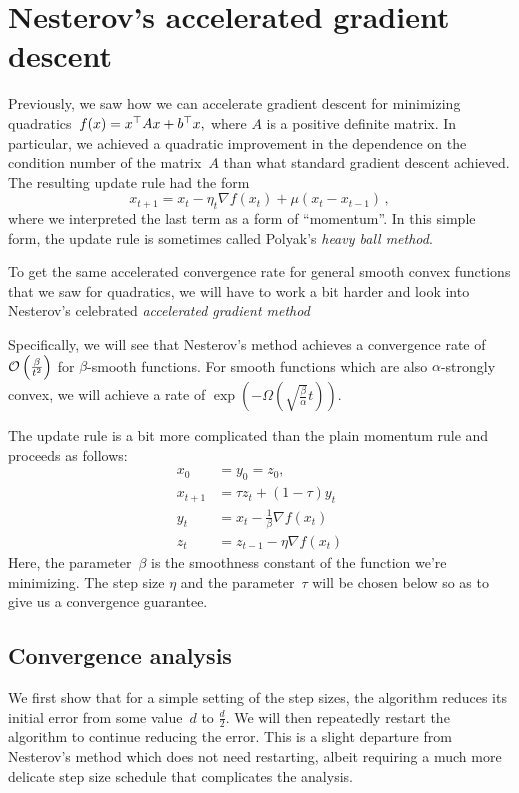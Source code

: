 \section{Nesterov’s accelerated gradient descent}

Previously, we saw how we can accelerate gradient descent for minimizing
quadratics~$f(x)=x^\top A x+b^\top x,$ where $A$ is a positive definite
matrix. In particular, we achieved a quadratic improvement in the dependence
on the condition number of the matrix~$A$ than what standard gradient descent
achieved. The resulting update rule had the form
\[
x_{t+1} = x_t -\eta_t\nabla f(x_t) + \mu(x_t-x_{t-1})\,,
\]
where we interpreted the last term as a form of ``momentum''. In this simple
form, the update rule is sometimes called Polyak's \emph{heavy ball method}.

To get the same accelerated convergence rate for general smooth convex functions
that we saw for quadratics, we will have to work a bit harder and look into
Nesterov's celebrated \emph{accelerated gradient method}~\cite{Nesterov83,
Nesterov04}

Specifically, we will see that Nesterov's method achieves a convergence rate
of~${\cal O} \left(\frac{\beta}{t^2}\right)$ for $\beta$-smooth functions. For smooth
functions which are also $\alpha$-strongly convex, we will achieve a rate of
$\exp\left( -\Omega\left(\sqrt{\frac{\beta}{\alpha}} t\right)\right)$. 

The update rule is a bit more complicated than the plain momentum rule 
and proceeds as follows:
\begin{align*}
x_0 &= y_0 = z_0, \\
x_{t+1} &= \tau z_t + (1 - \tau) y_t \tag{$t\ge 0$}\\
y_t &= x_t - \frac{1}{\beta} \nabla f(x_t) \tag{$t\ge 1$}\\
z_t &= z_{t-1} - \eta\nabla f(x_t)\tag{$t\ge 1$}
\end{align*}
Here, the parameter~$\beta$ is the smoothness constant of the function we're
minimizing. The step size $\eta$ and the parameter~$\tau$ will be chosen below
so as to give us a convergence guarantee.

\subsection{Convergence analysis}

We first show that for a simple setting of the step sizes, the algorithm reduces
its initial error from some value~$d$ to $\frac{d}{2}.$ We will then repeatedly
restart the algorithm to continue reducing the error. This is a slight departure
from Nesterov's method which does not need restarting, albeit requiring a much
more delicate step size schedule that complicates the analysis.


